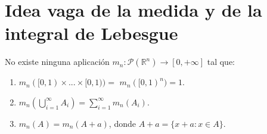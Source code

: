 \newpage
\section{Idea vaga de la medida y de la integral de Lebesgue}

\begin{teo}
    \label{teo:asd}
    No existe ninguna aplicación $ m_n: \mathcal{P}(\mathbb{R}^n) \longrightarrow [0, +\infty]$ tal que:
    \begin{enumerate}
        \item[(i)] $m_n([0,1) \times ... \times [0,1)) = $ $m_n([0,1)^n) = 1$.
        \item[(ii)] $m_n\left(\displaystyle\bigcup_{i=1}^{\infty}{A_i }\right) = \displaystyle\sum_{i=1}^\infty m_n(A_i)$.
        \item[(iii)] $m_n(A) = m_n(A+a)$, donde $A + a = \{x+a : x \in A\}$.
    \end{enumerate}
\end{teo}
